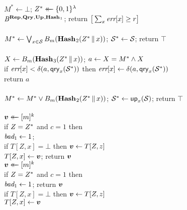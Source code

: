 \begin{figure*}
{
  \vspace{-7pt}
      \hfill {}\\[2pt]
    $M^* \gets \bot$;
    $Z^* \mathrel{\leftarrow\mkern-14mu\leftarrow} \{0,1\}^\lambda$\\
    $\mathit{B}^{\textup{\textbf{Rep}}\hspace{0.5pt},\textup{\textbf{Qry}}\hspace{0.5pt},\textup{\textbf{Up}}\hspace{0.5pt},\textup{\textbf{Hash}}\hspace{0.5pt}_1}$;
    return $\big[\sum_x \textit{err}[x] \geq r\big]$
  \\[6pt]
  \oraclev{$\REPO(\col)$}\\[2pt]
    $M^* \gets \bigvee_{x \in \mathcal{S}} {B}_m(\textup{\textbf{Hash}}\hspace{0.5pt}_2(Z^* \, \| \, x))$;
    $\mathcal{S}^* \gets \mathcal{S}$;
    return $\top$
  \\[6pt]
  \\[2pt]
    $X \gets {B}_m(\textup{\textbf{Hash}}\hspace{0.5pt}_3(Z^* \, \| \, x))$;
    $a \gets X = M^* \wedge X$\\
    if $\textit{err}[x] < \delta(a,\mathsf{qry}_x(\mathcal{S}^*))$ then
          $\textit{err}[x] \gets \delta(a,\mathsf{qry}_x(\mathcal{S}^*))$\\
    return $a$
  \\[6pt]
  \\[2pt]
    $M^* \gets M^* \vee {B}_m(\textup{\textbf{Hash}}\hspace{0.5pt}_2(Z^* \, \| \, x))$;
    $\mathcal{S}^* \gets \mathsf{up}_x(\mathcal{S})$;
    return $\top$
  \\[6pt]
  \\[2pt]
    $\boldsymbol{v} \mathrel{\leftarrow\mkern-14mu\leftarrow} [m]^k$\\
    if $Z=Z^*$ and $c = 1$ then \\
    \tab $\textit{bad}_1 \gets 1$; \\
    if $T[Z,x] = \bot$ then $\boldsymbol{v} \gets T[Z,z]$\\
    $T[Z,x] \gets \boldsymbol{v}$; return $\boldsymbol{v}$
}
{
  \vspace{-2pt}
  \\[2pt]
    $\boldsymbol{v} \mathrel{\leftarrow\mkern-14mu\leftarrow} [m]^k$\\
    if $Z=Z^*$ and $c=1$ then\\
    \tab $\textit{bad}_1 \gets 1$; return $\boldsymbol{v}$\\
    if $T[Z,x] = \bot$ then $\boldsymbol{v} \gets T[Z,z]$\\
    $T[Z,x] \gets \boldsymbol{v}$\\[2pt]
    }
\end{figure*}
